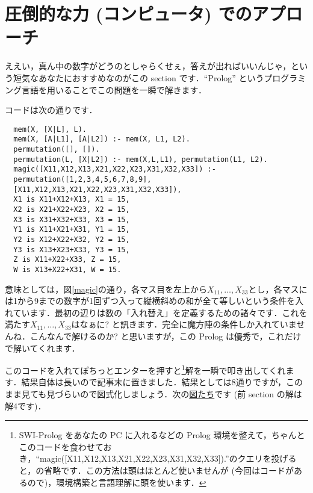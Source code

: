 \documentclass[11pt]{jsarticle}
\begin{document}
\section{圧倒的な力 (コンピュータ) でのアプローチ}
ええい，真ん中の数字がどうのとしゃらくせぇ，答えが出ればいいんじゃ，という短気なあなたにおすすめなのがこの section です．``Prolog'' というプログラミング言語を用いることでこの問題を一瞬で解きます．

コードは次の通りです\cite{gengo}．

\begin{lstlisting}
  mem(X, [X|L], L).
  mem(X, [A|L1], [A|L2]) :- mem(X, L1, L2).
  permutation([], []).
  permutation(L, [X|L2]) :- mem(X,L,L1), permutation(L1, L2).
  magic([X11,X12,X13,X21,X22,X23,X31,X32,X33]) :-
  permutation([1,2,3,4,5,6,7,8,9],
  [X11,X12,X13,X21,X22,X23,X31,X32,X33]),
  X1 is X11+X12+X13, X1 = 15,
  X2 is X21+X22+X23, X2 = 15,
  X3 is X31+X32+X33, X3 = 15,
  Y1 is X11+X21+X31, Y1 = 15,
  Y2 is X12+X22+X32, Y2 = 15,
  Y3 is X13+X23+X33, Y3 = 15,
  Z is X11+X22+X33, Z = 15,
  W is X13+X22+X31, W = 15.
\end{lstlisting}
意味としては，図\ref{magic}の通り，各マス目を左上から$X_{11},\ldots ,X_{33}$とし，各マスには1から9までの数字が1回ずつ入って縦横斜めの和が全て等しいという条件を入れています．最初の辺りは数の「入れ替え」を定義するための諸々です．これを満たす$X_{11},\ldots ,X_{33}$はなぁに? と訊きます．完全に魔方陣の条件しか入れていませんね．こんなんで解けるのか? と思いますが，この Prolog は優秀で，これだけで解いてくれます．

このコードを入れてぽちっとエンターを押すと\footnote{SWI-Prolog をあなたの PC に入れるなどの Prolog 環境を整えて，ちゃんとこのコードを食わせておき，``magic([X11,X12,X13,X21,X22,X23,X31,X32,X33]).''のクエリを投げると，の省略です．この方法は頭はほとんど使いませんが (今回はコードがあるので)，環境構築と言語理解に頭を使います．}解を一瞬で叩き出してくれます．結果自体は長いので記事末に置きました．結果としては8通りですが，このまま見ても見づらいので図式化しましょう．次の\hyperlink{ans}{図たち}です (前 section の解は解4です)．
\end{document}
